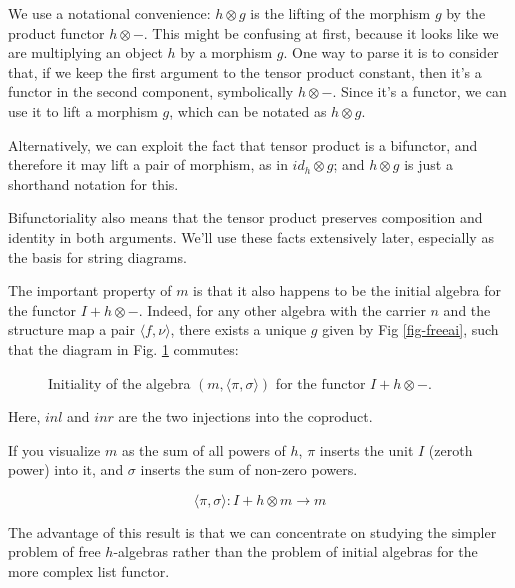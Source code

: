 \documentclass[letterpaper, 10 pt, conference]{ieeeconf}
\begin{document}
We use a notational convenience: $h \otimes g$ is the lifting of the morphism $g$ by the product functor $h \otimes -$. This might be confusing at first, because it looks like we are multiplying an object $h$ by a morphism $g$. One way to parse it is to consider that, if we keep the first argument to the tensor product constant, then it's a functor in the second component, symbolically $h \otimes -$. Since it's a functor, we can use it to lift a morphism $g$, which can be notated as $h \otimes g$. 

Alternatively, we can exploit the fact that tensor product is a bifunctor, and therefore it may lift a pair of morphism, as in $id_h \otimes g$; and $h \otimes g$ is just a shorthand notation for this.

Bifunctoriality also means that the tensor product preserves composition and identity in both arguments. We'll use these facts extensively later, especially as the basis for string diagrams.

The important property of $m$ is that it also happens to be the initial algebra for the functor $I + h \otimes -$. Indeed, for any other algebra with the carrier $n$ and the structure map a pair $\langle f, \nu \rangle$, there exists a unique $g$  given by Fig \ref{fig-freeai}, such that the diagram in Fig. \ref{fig-inita} commutes:

\begin{figure}[h]
\centering
{}
\caption{Initiality of the algebra $(m, \langle \pi, \sigma \rangle)$ for the functor $I + h \otimes -$.}
\label{fig-inita}
\end{figure}
Here, $inl$ and $inr$ are the two injections into the coproduct.

If you visualize $m$ as the sum of all powers of $h$, $\pi$ inserts the unit $I$ (zeroth power) into it, and $\sigma$ inserts the sum of non-zero powers.

\[\langle \pi, \sigma \rangle \colon I + h \otimes m \to m \]

The advantage of this result is that we can concentrate on studying the simpler problem of free $h$-algebras rather than the problem of initial algebras for the more complex list functor. 
\end{document}
